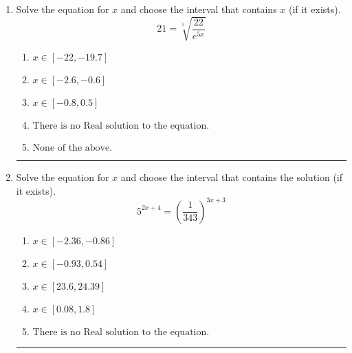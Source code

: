 \documentclass[14pt]{extbook}
\newcommand{\litem}[1]{\item#1\hspace*{-1cm}\rule{\textwidth}{0.4pt}}
\begin{document}
\begin{enumerate}
{\begin{enumerate}[label=\Alph*.]
\end{enumerate} }
\litem{
 Solve the equation for $x$ and choose the interval that contains $x$ (if it exists).\[  21 = \sqrt[5]{\frac{22}{e^{5x}}} \]\begin{enumerate}[label=\Alph*.]
\item \( x \in [-22, -19.7] \)
\item \( x \in [-2.6, -0.6] \)
\item \( x \in [-0.8, 0.5] \)
\item \( \text{There is no Real solution to the equation.} \)
\item \( \text{None of the above.} \)

\end{enumerate} }
\litem{
Solve the equation for $x$ and choose the interval that contains the solution (if it exists).\[ 5^{2x+4} = \left(\frac{1}{343}\right)^{3x+3} \]\begin{enumerate}[label=\Alph*.]
\item \( x \in [-2.36, -0.86] \)
\item \( x \in [-0.93, 0.54] \)
\item \( x \in [23.6, 24.39] \)
\item \( x \in [0.08, 1.8] \)
\item \( \text{There is no Real solution to the equation.} \)

\end{enumerate} }
\end{enumerate}
\end{document}
